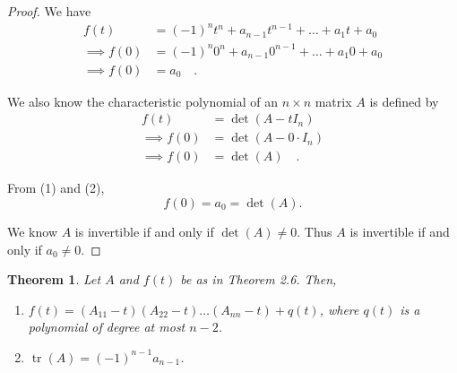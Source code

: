 \documentclass[12pt, a4paper]{article}
\newtheorem{theorem}{Theorem}[section]
\theoremstyle{definition}
\theoremstyle{remark}
\DeclareMathOperator{\tr}{tr}
\begin{document}
\begin{proof}
We have
\begin{align*}
f(t) &= (-1)^n t^n + a_{n-1} t^{n-1} + \dots + a_1 t + a_0 \\
\implies f(0) &= (-1)^n 0^n + a_{n-1} 0^{n-1} + \dots + a_1 0 + a_0 \\
\implies f(0) &= a_0 \quad \tag{1}.
\end{align*}

We also know the characteristic polynomial of an $n \times n$ matrix $A$ is defined by
\begin{align*}
f(t) &= \det(A - t I_n) \\
\implies f(0) &= \det(A - 0 \cdot I_n) \\
\implies f(0) &= \det(A) \quad \tag{2}.
\end{align*}

From (1) and (2),
\[
f(0) = a_0 = \det(A).
\]

We know $A$ is invertible if and only if $\det(A) \neq 0$. Thus $A$ is invertible if and only if $a_0 \neq 0$.
\end{proof}

\begin{theorem}
    Let $A$ and $f(t)$ be as in Theorem 2.6. Then,

\begin{enumerate}
    \item $f(t) = (A_{11} - t)(A_{22} - t) \dots (A_{nn} - t) + q(t)$, where $q(t)$ is a polynomial of degree at most $n-2$.
    \item $\tr(A) = (-1)^{n-1} a_{n-1}$.
\end{enumerate}
\end{theorem}
\end{document}
